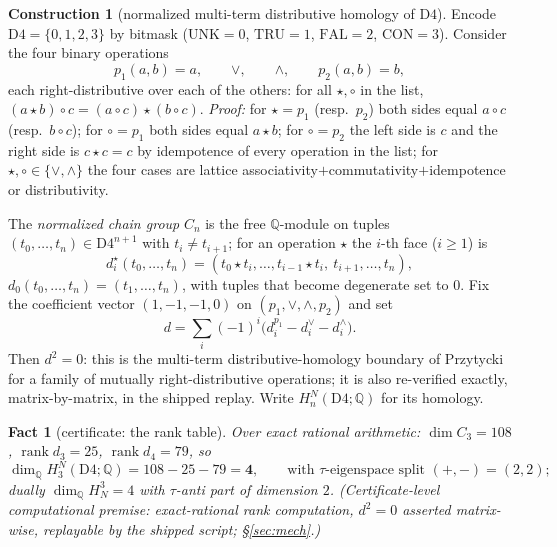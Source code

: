 \documentclass[11pt]{article}
\newtheorem{fact}[theorem]{Fact}
\theoremstyle{definition}
\newtheorem{construction}[theorem]{Construction}
\theoremstyle{remark}
\newcommand{\Q}{\mathbb{Q}}
\newcommand{\UNK}{\mathrm{UNK}}
\newcommand{\TRU}{\mathrm{TRU}}
\newcommand{\FAL}{\mathrm{FAL}}
\newcommand{\CON}{\mathrm{CON}}
\newcommand{\Dfour}{\mathrm{D4}}
\begin{document}
\begin{construction}[normalized multi-term distributive homology of $\Dfour$]\label{con:dh}
Encode $\Dfour=\{0,1,2,3\}$ by bitmask ($\UNK=0$, $\TRU=1$, $\FAL=2$, $\CON=3$). Consider the four binary operations
\[
p_1(a,b)=a,\qquad \vee,\qquad \wedge,\qquad p_2(a,b)=b,
\]
each right-distributive over each of the others: for all $\star,\circ$ in the list, $(a\star b)\circ c=(a\circ c)\star(b\circ c)$. \emph{Proof:} for $\star=p_1$ (resp.\ $p_2$) both sides equal $a\circ c$ (resp.\ $b\circ c$); for $\circ=p_1$ both sides equal $a\star b$; for $\circ=p_2$ the left side is $c$ and the right side is $c\star c=c$ by idempotence of every operation in the list; for $\star,\circ\in\{\vee,\wedge\}$ the four cases are lattice associativity$+$commutativity$+$idempotence or distributivity.

The \emph{normalized chain group} $C_n$ is the free $\Q$-module on tuples $(t_0,\dots,t_n)\in\Dfour^{n+1}$ with $t_i\ne t_{i+1}$; for an operation $\star$ the $i$-th face ($i\ge1$) is
\[
d_i^\star(t_0,\dots,t_n)=(t_0\star t_i,\dots,t_{i-1}\star t_i,\ t_{i+1},\dots,t_n),
\]
$d_0(t_0,\dots,t_n)=(t_1,\dots,t_n)$, with tuples that become degenerate set to $0$. Fix the coefficient vector $(1,-1,-1,0)$ on $(p_1,\vee,\wedge,p_2)$ and set
\[
d=\sum_i(-1)^i\bigl(d_i^{p_1}-d_i^{\vee}-d_i^{\wedge}\bigr).
\]
Then $d^2=0$: this is the multi-term distributive-homology boundary of Przytycki \cite{przytycki} for a family of mutually right-distributive operations; it is also re-verified exactly, matrix-by-matrix, in the shipped replay. Write $H^N_n(\Dfour;\Q)$ for its homology.
\end{construction}

\begin{fact}[certificate: the rank table]\label{fact:ranks}
Over exact rational arithmetic: $\dim C_3=108$, $\operatorname{rank}d_3=25$, $\operatorname{rank}d_4=79$, so
\[
\dim_\Q H^N_3(\Dfour;\Q)=108-25-79=\mathbf 4,\qquad \text{with $\tau$-eigenspace split }(+,-)=(2,2);
\]
dually $\dim_\Q H^3_N=4$ with $\tau$-anti part of dimension $2$. \emph{(Certificate-level computational premise: exact-rational rank computation, $d^2=0$ asserted matrix-wise, replayable by the shipped script; \S\ref{sec:mech}.)}
\end{fact}
\end{document}
